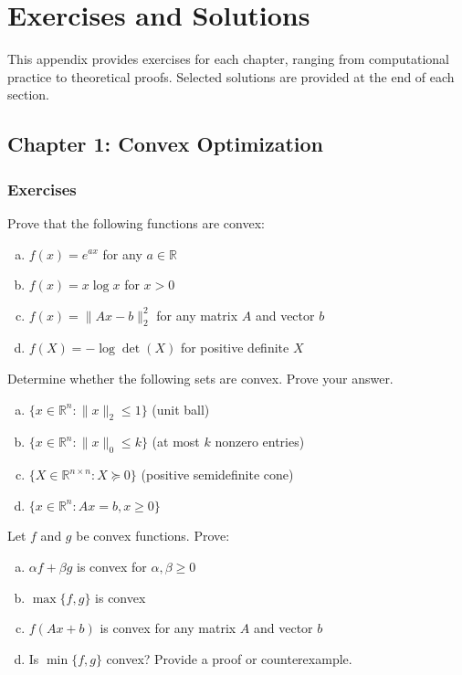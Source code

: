 \documentclass[../main.tex]{subfiles}
\begin{document}
\chapter{Exercises and Solutions}\label{app:exercises}

This appendix provides exercises for each chapter, ranging from computational practice to theoretical proofs. Selected solutions are provided at the end of each section.

\section{Chapter 1: Convex Optimization}\label{sec:ex-convex}

\subsection{Exercises}

\begin{simpleexercise}
Prove that the following functions are convex:
\begin{enumerate}[(a)]
    \item $f(x) = e^{ax}$ for any $a \in \mathbb{R}$
    \item $f(x) = x \log x$ for $x > 0$
    \item $f(x) = \|Ax - b\|_2^2$ for any matrix $A$ and vector $b$
    \item $f(X) = -\log \det(X)$ for positive definite $X$
\end{enumerate}
\end{simpleexercise}

\begin{simpleexercise}
Determine whether the following sets are convex. Prove your answer.
\begin{enumerate}[(a)]
    \item $\{x \in \mathbb{R}^n : \|x\|_2 \leq 1\}$ (unit ball)
    \item $\{x \in \mathbb{R}^n : \|x\|_0 \leq k\}$ (at most $k$ nonzero entries)
    \item $\{X \in \mathbb{R}^{n \times n} : X \succeq 0\}$ (positive semidefinite cone)
    \item $\{x \in \mathbb{R}^n : Ax = b, x \geq 0\}$
\end{enumerate}
\end{simpleexercise}

\begin{simpleexercise}
Let $f$ and $g$ be convex functions. Prove:
\begin{enumerate}[(a)]
    \item $\alpha f + \beta g$ is convex for $\alpha, \beta \geq 0$
    \item $\max\{f, g\}$ is convex
    \item $f(Ax + b)$ is convex for any matrix $A$ and vector $b$
    \item Is $\min\{f, g\}$ convex? Provide a proof or counterexample.
\end{enumerate}
\end{simpleexercise}
\end{document}

